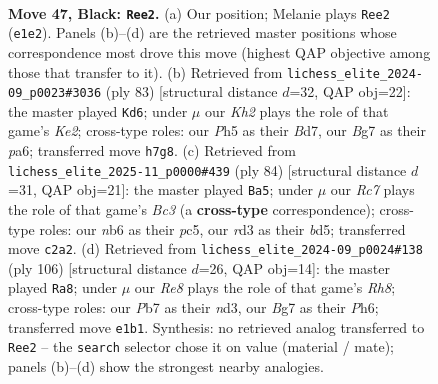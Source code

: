 \documentclass[11pt]{article}
\begin{document}
\clearpage

\begin{figure}[p]\centering
\begin{subfigure}{0.46\textwidth}\centering
\resizebox{\linewidth}{!}{%
\newchessgame
\chessboard[
  setfen={8/1p4bk/1N4p1/5p1p/P7/3R1KPP/2r2P2/4r3 b - - 10 47},
  showmover=false,
  pgfstyle=straightmove, color=movearrow, markmove={e1-e2}
]}
\caption{}
\end{subfigure}\hfill
\begin{subfigure}{0.46\textwidth}\centering
\resizebox{\linewidth}{!}{%
\newchessgame
\chessboard[
  setfen={8/p2bk1p1/P4p1p/3Bp2P/4P3/1R4K1/2r2PP1/8 b - - 8 42},
  showmover=false,
  pgfstyle=straightmove, color=movearrow, markmove={e7-d6}
]}
\caption{}
\end{subfigure}
\\[4pt]
\begin{subfigure}{0.46\textwidth}\centering
\resizebox{\linewidth}{!}{%
\newchessgame
\chessboard[
  setfen={2r5/4R1p1/5pk1/2pb3p/7P/2BK2P1/5P2/8 w - - 0 43},
  showmover=false,
  pgfstyle=straightmove, color=movearrow, markmove={c3-a5}
]}
\caption{}
\end{subfigure}\hfill
\begin{subfigure}{0.46\textwidth}\centering
\resizebox{\linewidth}{!}{%
\newchessgame
\chessboard[
  setfen={7R/4kp2/1R4pP/4r1p1/p5P1/3n1P2/P5K1/8 w - - 3 54},
  showmover=false,
  pgfstyle=straightmove, color=movearrow, markmove={h8-a8}
]}
\caption{}
\end{subfigure}
\caption{\textbf{Move 47, Black: \texttt{Ree2}.} (a) Our position; Melanie plays \texttt{Ree2} (\texttt{e1e2}). Panels (b)--(d) are the retrieved master positions whose correspondence most drove this move (highest QAP objective among those that transfer to it). (b) Retrieved from \texttt{lichess\_elite\_2024-09\_p0023\#3036} (ply 83) [structural distance $d$=32, QAP obj=22]: the master played \texttt{Kd6}; under $\mu$ our \emph{Kh2} plays the role of that game's \emph{Ke2}; cross-type roles: our \emph{P}h5 as their \emph{B}d7, our \emph{B}g7 as their \emph{p}a6; transferred move \texttt{h7g8}. (c) Retrieved from \texttt{lichess\_elite\_2025-11\_p0000\#439} (ply 84) [structural distance $d$=31, QAP obj=21]: the master played \texttt{Ba5}; under $\mu$ our \emph{Rc7} plays the role of that game's \emph{Bc3} (a \textbf{cross-type} correspondence); cross-type roles: our \emph{n}b6 as their \emph{p}c5, our \emph{r}d3 as their \emph{b}d5; transferred move \texttt{c2a2}. (d) Retrieved from \texttt{lichess\_elite\_2024-09\_p0024\#138} (ply 106) [structural distance $d$=26, QAP obj=14]: the master played \texttt{Ra8}; under $\mu$ our \emph{Re8} plays the role of that game's \emph{Rh8}; cross-type roles: our \emph{P}b7 as their \emph{n}d3, our \emph{B}g7 as their \emph{P}h6; transferred move \texttt{e1b1}. Synthesis: no retrieved analog transferred to \texttt{Ree2} -- the \texttt{search} selector chose it on value (material / mate); panels (b)--(d) show the strongest nearby analogies.}
\label{fig:thought-m93}
\end{figure}
\end{document}
